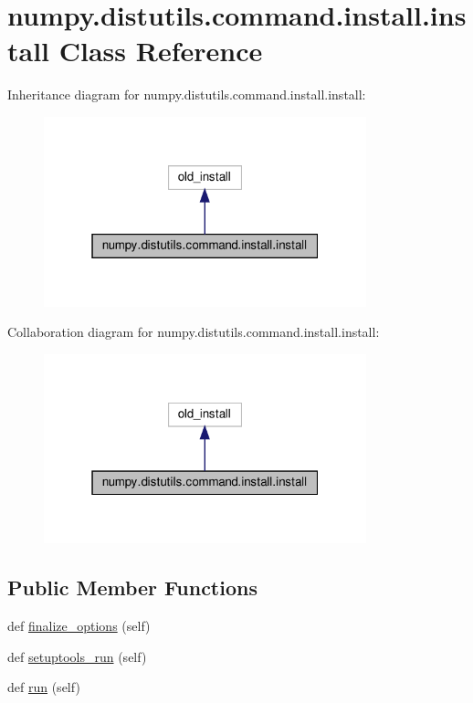 \hypertarget{classnumpy_1_1distutils_1_1command_1_1install_1_1install}{}\section{numpy.\+distutils.\+command.\+install.\+install Class Reference}
\label{classnumpy_1_1distutils_1_1command_1_1install_1_1install}


Inheritance diagram for numpy.\+distutils.\+command.\+install.\+install\+:
\nopagebreak
\begin{figure}[H]
\begin{center}
\leavevmode
\includegraphics[width=265pt]{classnumpy_1_1distutils_1_1command_1_1install_1_1install__inherit__graph}
\end{center}
\end{figure}


Collaboration diagram for numpy.\+distutils.\+command.\+install.\+install\+:
\nopagebreak
\begin{figure}[H]
\begin{center}
\leavevmode
\includegraphics[width=265pt]{classnumpy_1_1distutils_1_1command_1_1install_1_1install__coll__graph}
\end{center}
\end{figure}
\subsection*{Public Member Functions}
\begin{DoxyCompactItemize}
\item 
def \hyperlink{classnumpy_1_1distutils_1_1command_1_1install_1_1install_ae507e6179c5fcda9e9ad70914c6d57e5}{finalize\+\_\+options} (self)
\item 
def \hyperlink{classnumpy_1_1distutils_1_1command_1_1install_1_1install_afe96c1af8f0c6c83cceb3639f047e3e0}{setuptools\+\_\+run} (self)
\item 
def \hyperlink{classnumpy_1_1distutils_1_1command_1_1install_1_1install_a2de9dd77714884f3297cd9cbc975e38d}{run} (self)
\end{DoxyCompactItemize}
